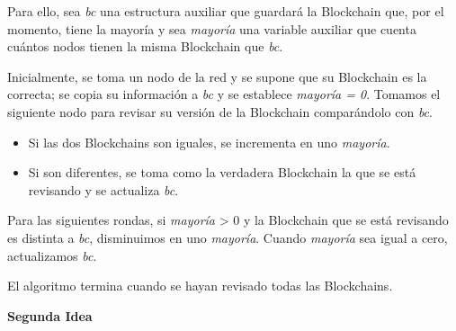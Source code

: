 {{    Para ello, sea \textit{bc} una estructura auxiliar que guardará la Blockchain que, por el momento, tiene la mayoría y sea \textit{mayoría} una variable auxiliar que cuenta cuántos nodos tienen la misma Blockchain que \textit{bc}.  \vspace{.3cm}

    Inicialmente, se toma un nodo de la red y se supone que su Blockchain es la correcta; se copia su información a \textit{bc} y se establece \textit{mayoría = 0}. Tomamos el siguiente nodo para revisar su versión de la Blockchain comparándolo con \textit{bc}.  \vspace{.3cm}

    \begin{itemize}
        \item Si las dos Blockchains son iguales, se incrementa en uno \textit{mayoría}.
        \item Si son diferentes, se toma como la verdadera Blockchain la que se está revisando y se actualiza \textit{bc}.  \vspace{.3cm}
    \end{itemize}

    Para las siguientes rondas, si \textit{mayoría} > 0 y la Blockchain que se está revisando es distinta a \textit{bc}, disminuimos en uno \textit{mayoría}. Cuando \textit{mayoría} sea igual a cero, actualizamos \textit{bc}.  \vspace{.3cm}

    El algoritmo termina cuando se hayan revisado todas las Blockchains.
}}

\vspace{1cm}
{\Huge{\textbf{Segunda Idea}}} 
\vspace{1cm}

